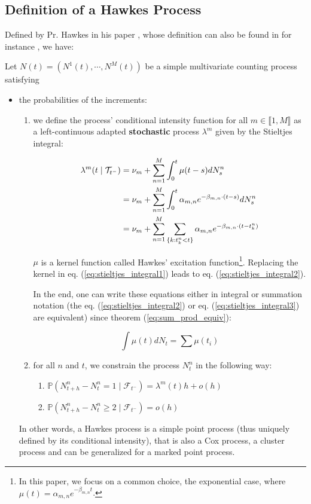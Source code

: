 \documentclass[11pt]{book}
\begin{document}
\subsection{Definition of a Hawkes Process}
Defined by Pr. Hawkes in his paper \cite{Hawkes}, whose definition can also be found in for instance \cite{Chen}, we have:
\begin{definition}
Let $N(t) = \left ( N^1(t), \cdots , N^M(t) \right )$ be a simple multivariate counting process satisfying 

\begin{itemize}
\setlength{\itemindent}{2 cm}
\item the probabilities of the increments:
\begin{enumerate}
\setlength{\itemindent}{3 cm}
\item we define the process' conditional intensity function for all $m \in \llbracket 1, M \rrbracket$ as a left-continuous adapted \textbf{stochastic} process  $\lambda^m$ given by the Stieltjes integral:

\begin{align}
\lambda^m (t \mid \mathcal{T}_{t^-} ) &= 
\nu_m + \sum_{n = 1}^M \int_0^t \mu( t - s ) d N^n_s  \label{eq:stieltjes_integral1} \\
&= \nu_m + \sum_{n = 1}^M \int_0^t \alpha_{m,n} e^{- \beta_{m,n} \cdot ( t - s ) } d N^n_s  \label{eq:stieltjes_integral2} \\
&= \nu_m + \sum_{n = 1}^M \sum_{ \{k: t_k^n < t \}} \alpha_{m,n} e^{- \beta_{m,n} \cdot ( t - t_k^n ) } \label{eq:stieltjes_integral3}
\end{align}

$ \mu $ is a kernel function called Hawkes' excitation function\footnote{In this paper, we focus on a common choice, the exponential case, where $\mu(t) = \alpha_{m,n} e^{- \beta_{m,n}  t  }$.}. Replacing the kernel in eq. (\ref{eq:stieltjes_integral1}) leads to eq. (\ref{eq:stieltjes_integral2}).


In the end, one can write these equations either in integral or summation notation (the eq. (\ref{eq:stieltjes_integral2}) or eq. (\ref{eq:stieltjes_integral3}) are equivalent) since theorem (\ref{eq:sum_prod_equiv}):

$$ \int \mu(t) dN_t = \sum \mu(t_i) $$
 

\item  for all $n$ and $t$, we constrain the process $N^n_t$ in the following way:

\begin{enumerate}
\setlength{\itemindent}{4 cm}
\item $\mathbb P( N^n_{t+h} - N^n_{t} = 1 \mid \mathcal F_{t^-} ) = \lambda^m (t) h + o(h)$
\item $\mathbb P( N^n_{t+h} - N^n_{t} \geq 2 \mid \mathcal F_{t^-} ) =  o(h)$
\end{enumerate}
\end{enumerate}
In other words, a Hawkes process is a simple point process (thus uniquely defined by its conditional intensity), that is also a Cox process, a cluster process and can be generalized for a marked point process. 



\end{itemize}
\end{definition}
\end{document}
